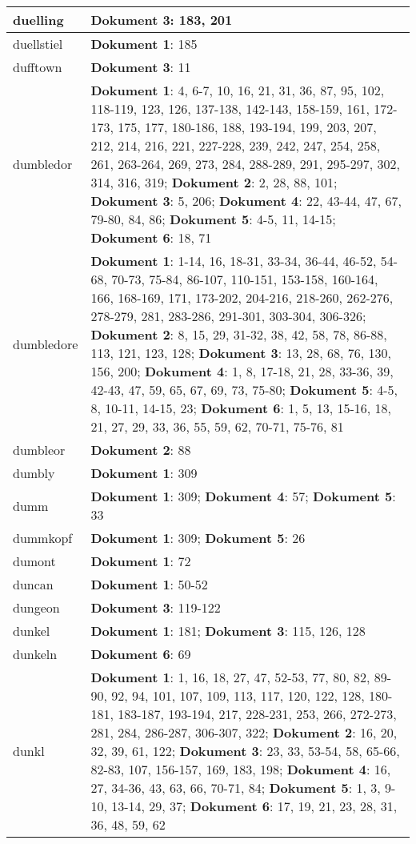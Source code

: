 \documentclass[a5paper]{article}
\begin{document}
\begin{longtable}[l]{|l|p{3in}|}
\hline
duelling & \textbf{Dokument 3}: 183, 201 \\
\hline
duellstiel & \textbf{Dokument 1}: 185 \\
\hline
dufftown & \textbf{Dokument 3}: 11 \\
\hline
dumbledor & \textbf{Dokument 1}: 4, 6-7, 10, 16, 21, 31, 36, 87, 95, 102, 118-119, 123, 126, 137-138, 142-143, 158-159, 161, 172-173, 175, 177, 180-186, 188, 193-194, 199, 203, 207, 212, 214, 216, 221, 227-228, 239, 242, 247, 254, 258, 261, 263-264, 269, 273, 284, 288-289, 291, 295-297, 302, 314, 316, 319; \textbf{Dokument 2}: 2, 28, 88, 101; \textbf{Dokument 3}: 5, 206; \textbf{Dokument 4}: 22, 43-44, 47, 67, 79-80, 84, 86; \textbf{Dokument 5}: 4-5, 11, 14-15; \textbf{Dokument 6}: 18, 71 \\
\hline
dumbledore & \textbf{Dokument 1}: 1-14, 16, 18-31, 33-34, 36-44, 46-52, 54-68, 70-73, 75-84, 86-107, 110-151, 153-158, 160-164, 166, 168-169, 171, 173-202, 204-216, 218-260, 262-276, 278-279, 281, 283-286, 291-301, 303-304, 306-326; \textbf{Dokument 2}: 8, 15, 29, 31-32, 38, 42, 58, 78, 86-88, 113, 121, 123, 128; \textbf{Dokument 3}: 13, 28, 68, 76, 130, 156, 200; \textbf{Dokument 4}: 1, 8, 17-18, 21, 28, 33-36, 39, 42-43, 47, 59, 65, 67, 69, 73, 75-80; \textbf{Dokument 5}: 4-5, 8, 10-11, 14-15, 23; \textbf{Dokument 6}: 1, 5, 13, 15-16, 18, 21, 27, 29, 33, 36, 55, 59, 62, 70-71, 75-76, 81 \\
\hline
dumbleor & \textbf{Dokument 2}: 88 \\
\hline
dumbly & \textbf{Dokument 1}: 309 \\
\hline
dumm & \textbf{Dokument 1}: 309; \textbf{Dokument 4}: 57; \textbf{Dokument 5}: 33 \\
\hline
dummkopf & \textbf{Dokument 1}: 309; \textbf{Dokument 5}: 26 \\
\hline
dumont & \textbf{Dokument 1}: 72 \\
\hline
duncan & \textbf{Dokument 1}: 50-52 \\
\hline
dungeon & \textbf{Dokument 3}: 119-122 \\
\hline
dunkel & \textbf{Dokument 1}: 181; \textbf{Dokument 3}: 115, 126, 128 \\
\hline
dunkeln & \textbf{Dokument 6}: 69 \\
\hline
dunkl & \textbf{Dokument 1}: 1, 16, 18, 27, 47, 52-53, 77, 80, 82, 89-90, 92, 94, 101, 107, 109, 113, 117, 120, 122, 128, 180-181, 183-187, 193-194, 217, 228-231, 253, 266, 272-273, 281, 284, 286-287, 306-307, 322; \textbf{Dokument 2}: 16, 20, 32, 39, 61, 122; \textbf{Dokument 3}: 23, 33, 53-54, 58, 65-66, 82-83, 107, 156-157, 169, 183, 198; \textbf{Dokument 4}: 16, 27, 34-36, 43, 63, 66, 70-71, 84; \textbf{Dokument 5}: 1, 3, 9-10, 13-14, 29, 37; \textbf{Dokument 6}: 17, 19, 21, 23, 28, 31, 36, 48, 59, 62 \\

\end{longtable}
\end{document}
